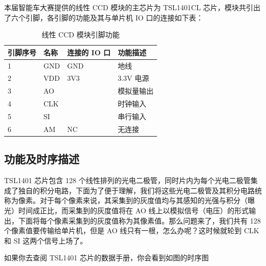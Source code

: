 本届智能车大赛提供的线性 CCD 模块的主芯片为 TSL1401CL 芯片，模块共引出了六个引脚，各引脚的功能及其与单片机 IO 口的连接如下表：

\begin{table}[]
 \centering
 \captionsetup{labelformat=empty}
 \caption{线性 CCD 模块引脚功能}
 \label{ccd_pinouts}
 \begin{tabular}{|l|l|l|l|}
  \hline
  引脚序号 & 名称 & 连接的 IO 口 & 功能描述    \\ \hline
  1            & GND    & GND              & 地线          \\
  2            & VDD    & 3V3              & 3.3V 电源     \\
  3            & AO     &                  & 模拟量输出 \\
  4            & CLK    &                  & 时钟输入    \\
  5            & SI     &                  & 串行输入    \\
  6            & AM     & NC               & 无连接       \\ \hline
 \end{tabular}
\end{table}

\subsection{功能及时序描述}

TSL1401 芯片包含 128 个线性排列的光电二极管，同时片内为每个光电二极管集成了独自的积分电路，下面为了便于理解，我们将这些光电二极管及其积分电路统称为像素。对于每个像素来说，其采集到的灰度值均与其感知的光强与积分（曝光）时间成正比，而采集到的灰度值将在 AO 线上以模拟信号（电压）的形式输出，下面将每个像素采集到的灰度值称为其像素值。那么问题来了，我们共有 128 个像素值要传输给单片机，但是 AO 线只有一根，怎么办呢？这时候就轮到 CLK 和 SI 这两个信号上场了。

如果你去查阅 TSL1401 芯片的数据手册，你会看到如图的时序图



